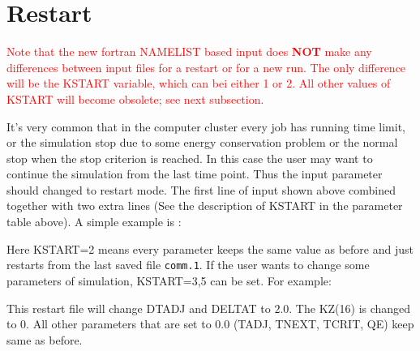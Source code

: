 \vspace{0.7cm}

\section*{Restart}

\textcolor{red}{
Note that the new fortran NAMELIST based input does {\bf NOT} make any differences between input files for a restart or for a new run. The only difference will be the KSTART variable, which can bei either 1 or 2. All other values of KSTART will become obsolete; see next subsection.
}

It's very common that in the computer cluster every job has running time limit,
or the simulation stop due to some energy conservation problem or the normal stop
when the stop criterion is reached. In this case the user may want to continue the
simulation from the last time point. Thus the input parameter should changed to 
restart mode. The first line of input shown above combined together with two 
extra lines (See the description of KSTART in the parameter table above).
A simple example is :

\begin{center}
\end{center}

Here KSTART=2 means every parameter keeps the same value as before and just restarts from
the last saved file \texttt{comm.1}. If the user wants to change some parameters
of simulation, KSTART=3,5 can be set. For example:

\begin{center}
\end{center}

This restart file will change DTADJ and DELTAT to $2.0$. The KZ(16) is changed to 0.
All other parameters that are set to $0.0$ (TADJ, TNEXT, TCRIT, QE) keep same as before.
